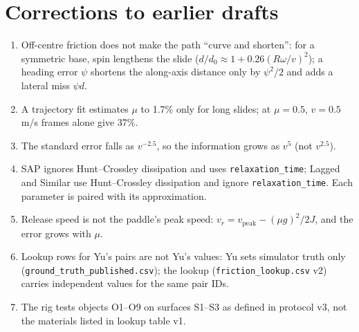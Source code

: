 \documentclass[10pt]{article}
\newcommand{\code}[1]{\texttt{#1}}
\begin{document}
\section{Corrections to earlier drafts}
\label{sec:corrections}
\begin{enumerate}\small
\item Off-centre friction does not make the path ``curve and shorten'': for a symmetric base, spin lengthens the slide
      ($d/d_0\approx1+0.26(R\omega/v)^2$); a heading error $\psi$ shortens the along-axis distance only by $\psi^2/2$ and
      adds a lateral miss $\psi d$.
\item A trajectory fit estimates $\mu$ to 1.7\% only for long slides; at $\mu=0.5$, $v=0.5$ m/s frames alone give 37\%.
\item The standard error falls as $v^{-2.5}$, so the information grows as $v^{5}$ (not $v^{2.5}$).
\item SAP ignores Hunt--Crossley dissipation and uses \code{relaxation\_time}; Lagged and Similar use Hunt--Crossley
      dissipation and ignore \code{relaxation\_time}.  Each parameter is paired with its approximation.
\item Release speed is not the paddle's peak speed: $v_r=v_{\text{peak}}-(\mu g)^2/2J$, and the error grows with $\mu$.
\item Lookup rows for Yu's pairs are not Yu's values: Yu sets simulator truth only (\code{ground\_truth\_published.csv});
      the lookup (\code{friction\_lookup.csv} v2) carries independent values for the same pair IDs.
\item The rig tests objects O1--O9 on surfaces S1--S3 as defined in protocol v3, not the materials listed in lookup
      table v1.
\end{enumerate}
\end{document}
